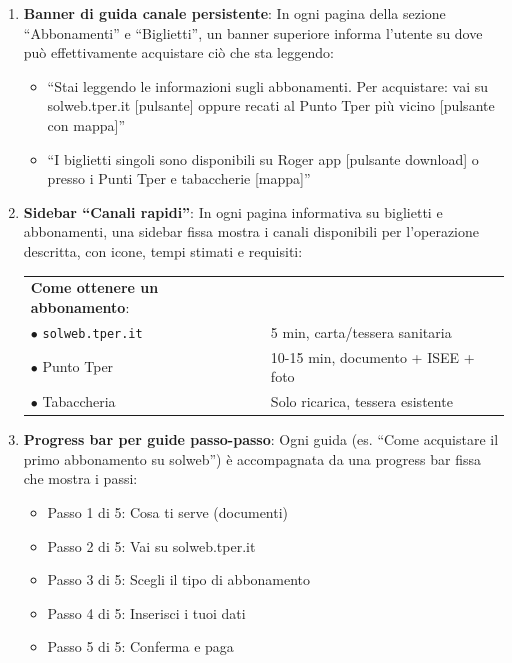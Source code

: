 \begin{tcolorbox}[colback=backgroundColor,colframe=borderColor,arc=2mm]
{\begin{enumerate}[leftmargin=*]
 \item \textbf{Banner di guida canale persistente}: In ogni pagina della sezione ``Abbonamenti'' e ``Biglietti'', un banner superiore informa l'utente su dove può effettivamente acquistare ciò che sta leggendo:
 \begin{itemize}
   \item ``Stai leggendo le informazioni sugli abbonamenti. Per acquistare: vai su solweb.tper.it [pulsante] oppure recati al Punto Tper più vicino [pulsante con mappa]''
   \item ``I biglietti singoli sono disponibili su Roger app [pulsante download] o presso i Punti Tper e tabaccherie [mappa]''
 \end{itemize}

 \item \textbf{Sidebar ``Canali rapidi''}: In ogni pagina informativa su biglietti e abbonamenti, una sidebar fissa mostra i canali disponibili per l'operazione descritta, con icone, tempi stimati e requisiti:
 \begin{center}
 \begin{tcolorbox}[colback=backgroundColor,colframe=borderColor,arc=2mm,width=0.7\textwidth]
 \small
 \begin{tabular}{ll}
 \textbf{Come ottenere un abbonamento}: & \\[4pt]
 $\bullet$ \texttt{solweb.tper.it} & 5 min, carta/tessera sanitaria \\
 $\bullet$ Punto Tper & 10-15 min, documento + ISEE + foto \\
 $\bullet$ Tabaccheria & Solo ricarica, tessera esistente \\
 \end{tabular}
 \end{tcolorbox}
 \end{center}

 \item \textbf{Progress bar per guide passo-passo}: Ogni guida (es. ``Come acquistare il primo abbonamento su solweb'') è accompagnata da una progress bar fissa che mostra i passi:
 \begin{itemize}
   \item Passo 1 di 5: Cosa ti serve (documenti)
   \item Passo 2 di 5: Vai su solweb.tper.it
   \item Passo 3 di 5: Scegli il tipo di abbonamento
   \item Passo 4 di 5: Inserisci i tuoi dati
   \item Passo 5 di 5: Conferma e paga
 \end{itemize}


\end{enumerate}}
\end{tcolorbox}
